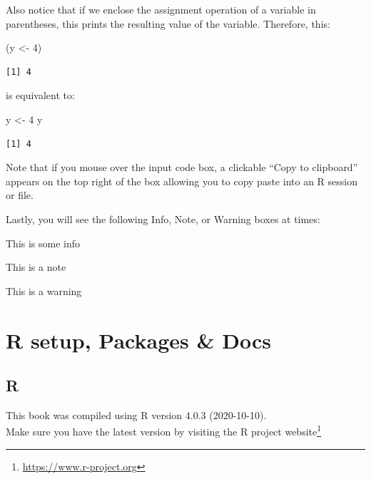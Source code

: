 \documentclass[
]{book}
\makeatletter
\newenvironment{Shaded}{\begin{snugshade}}{\end{snugshade}}
\newcommand{\DecValTok}[1]{\textcolor[rgb]{0.00,0.00,0.81}{#1}}
\newcommand{\NormalTok}[1]{#1}
\newcommand{\OtherTok}[1]{\textcolor[rgb]{0.56,0.35,0.01}{#1}}
\renewcommand{\href}[2]{#2\footnote{\url{#1}}}
\newenvironment{kframe}{%
\medskip{}
\setlength{\fboxsep}{.8em}
 \def\at@end@of@kframe{}%
 \ifinner\ifhmode%
  \def\at@end@of@kframe{\end{minipage}}%
  \begin{minipage}{\columnwidth}%
 \fi\fi%
 \def\FrameCommand##1{\hskip\@totalleftmargin \hskip-\fboxsep
 \colorbox{shadecolor}{##1}\hskip-\fboxsep
     \hskip-\linewidth \hskip-\@totalleftmargin \hskip\columnwidth}%
 \MakeFramed {\advance\hsize-\width
   \@totalleftmargin\z@ \linewidth\hsize
   \@setminipage}}%
 {\par\unskip\endMakeFramed%
 \at@end@of@kframe}
\newenvironment{rmdblock}[1]
  {
  \begin{itemize}
  \renewcommand{\labelitemi}{
    \raisebox{-.7\height}[0pt][0pt]{
      {\setkeys{Gin}{width=3em,keepaspectratio}\texttt{[image: images/\#1]}}
    }
  }
  \setlength{\fboxsep}{1em}
  \begin{kframe}
  \item
  }
  {
  \end{kframe}
  \end{itemize}
  }
\newenvironment{note}
  {\begin{rmdblock}{note}}
  {\end{rmdblock}}
\newenvironment{info}
  {\begin{rmdblock}{info}}
  {\end{rmdblock}}
\makeatother
\begin{document}
Also notice that if we enclose the assignment operation of a variable in parentheses, this prints the resulting value of the variable. Therefore, this:

\begin{Shaded}
\begin{Highlighting}[]
\NormalTok{(y }\OtherTok{\textless{}{-}} \DecValTok{4}\NormalTok{)}
\end{Highlighting}
\end{Shaded}

\begin{verbatim}
[1] 4
\end{verbatim}

is equivalent to:

\begin{Shaded}
\begin{Highlighting}[]
\NormalTok{y }\OtherTok{\textless{}{-}} \DecValTok{4}
\NormalTok{y}
\end{Highlighting}
\end{Shaded}

\begin{verbatim}
[1] 4
\end{verbatim}

Note that if you mouse over the input code box, a clickable ``Copy to clipboard'' appears on the top right of the box allowing you to copy paste into an R session or file.

Lastly, you will see the following Info, Note, or Warning boxes at times:

\begin{info}
This is some info
\end{info}

\begin{note}
This is a note
\end{note}

\begin{Warning}
This is a warning
\end{Warning}

\hypertarget{Rsetup}{%
\chapter{R setup, Packages \& Docs}\label{Rsetup}}

\hypertarget{r}{%
\section{R}\label{r}}

This book was compiled using R version 4.0.3 (2020-10-10).\\
Make sure you have the latest version by visiting the \href{https://www.r-project.org}{R project website}
\end{document}
